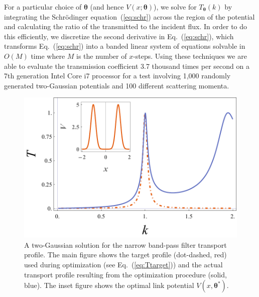 \documentclass[twocolumn,amsmath,amssymb,showpacs,pra,superscriptaddress,aps]{revtex4-1}
\begin{document}
For a particular choice of $\bm{\theta}$ (and hence $V(x;\bm{\theta})$), we solve for $T_{\bm{\theta}}(k)$ by integrating the Schr{\"o}dinger equation~(\ref{eq:schr}) across the region of the potential and calculating the ratio of the transmitted to the incident flux. In order to do this efficiently, we discretize the second derivative in Eq.~(\ref{eq:schr}), which transforms Eq.~(\ref{eq:schr}) into
a banded linear system of equations solvable in $O(M)$ time where $M$ is the number of $x$-steps. Using these techniques we are able to evaluate the transmission coefficient 3.7 thousand times per second on a 7th generation Intel Core i7 processor for a test involving 1,000 randomly generated two-Gaussian potentials and 100 different scattering momenta. 

\begin{figure}
   \includegraphics[width=1\linewidth]{plot_transport_profiles_with_inset.pdf}
 \caption[Narrow band-pass filter link potential]{A two-Gaussian solution for the narrow band-pass filter transport profile. The main figure shows the target profile (dot-dashed, red) used during optimization (see Eq.~(\ref{eq:Ttarget})) and the actual transport profile resulting from the optimization procedure (solid, blue). The inset figure shows the optimal link potential $V(x, \bm{\theta^*})$.}
 \label{fig:method_illustration}
\end{figure}

\end{document}
